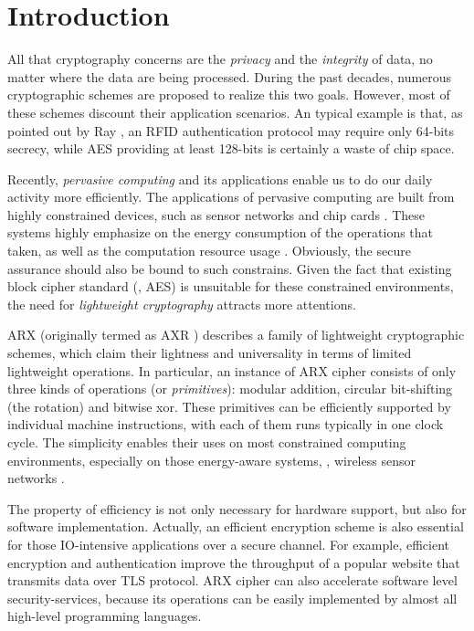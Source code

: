 \section{Introduction}

All that cryptography concerns are the \textit{privacy} and the \textit{integrity}
of data, no matter where the data are being processed. During the past decades,
numerous cryptographic schemes are proposed to realize this two goals. However,
most of these schemes discount their application scenarios. An typical example is
that, as pointed out by Ray \etal \cite{beaulieu2015simon}, an RFID authentication
protocol may require only 64-bits secrecy, while AES providing at least 128-bits
is certainly a waste of chip space.

Recently, \textit{pervasive computing} and its applications enable us to do our daily
activity more efficiently. The applications of pervasive computing are built from highly
constrained devices, such as sensor networks and chip cards \cite{hansmann2013pervasive}.
These systems highly emphasize on the energy consumption of the operations that taken,
as well as the computation resource usage \cite{satyanarayanan2001pervasive}. Obviously,
the secure assurance should also be bound to such constrains. Given the fact that
existing block cipher standard (\ie, AES) is unsuitable for these constrained
environments, the need for \textit{lightweight cryptography} attracts more attentions.

ARX (originally termed as AXR \cite{weinmann2009axr}) describes a family of lightweight
cryptographic schemes, which claim their lightness and universality in terms of limited
lightweight operations. In particular, an instance of ARX cipher consists of only three
kinds of operations (or \textit{primitives}): modular addition, circular bit-shifting
(the rotation) and bitwise xor. These primitives can be efficiently supported by
individual machine instructions, with each of them runs typically in one clock cycle.
The simplicity enables their uses on most constrained computing environments, especially
on those energy-aware systems, \eg, wireless sensor networks \cite{perrig2004security}.

The property of efficiency is not only necessary for hardware support, but also for
software implementation. Actually, an efficient encryption scheme is also essential for
those IO-intensive applications over a secure channel. For example, efficient encryption
and authentication improve the throughput of a popular website that transmits data
over TLS protocol. ARX cipher can also accelerate software level security-services,
because its operations can be easily implemented by almost all high-level programming
languages.

